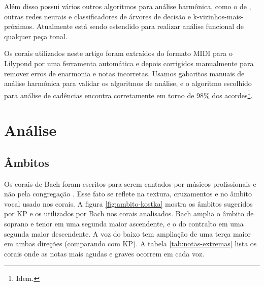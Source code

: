 Além disso \rameau{} possui vários outros algoritmos para análise
harmônica, como o de \cite{pardo.ea00:automated}, outras redes neurais
e classificadores de árvores de decisão e k-vizinhos-mais-próximos.
Atualmente \rameau{} está sendo estendido para realizar análise
funcional de qualquer peça tonal.

Os corais utilizados neste artigo foram extraídos do formato MIDI para
o Lilypond por uma ferramenta automática e depois corrigidos
manualmente para remover erros de enarmonia e notas incorretas. Usamos
gabaritos manuais de análise harmônica para validar os algoritmos de
análise, e o algoritmo escolhido para análise de cadências encontra
corretamente em torno de 98\% dos acordes\footnote{Idem.}.

\section{Análise}
\label{sec:analise}

\subsection{Âmbitos}
\label{sec:ambitos}

Os corais de Bach foram escritos para serem cantados por músicos
profissionais e não pela congregação \cite{bach41:371} . Esse fato
se reflete na textura, cruzamentos e no âmbito vocal usado nos corais.
A figura \ref{fig:ambito-kostka} mostra os âmbitos sugeridos por KP e
os utilizados por Bach nos corais analisados. Bach amplia o âmbito de
soprano e tenor em uma segunda maior ascendente, e o do contralto em
uma segunda maior descendente. A voz do baixo tem ampliação de uma
terça maior em ambas direções (comparando com KP). A tabela
\ref{tab:notas-extremas} lista os corais onde as notas mais agudas e
graves ocorrem em cada voz.

